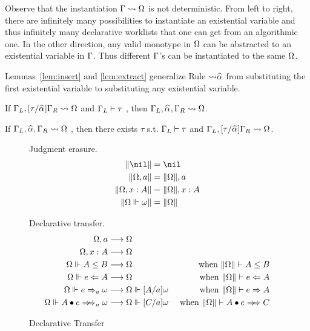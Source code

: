 Observe that the instantiation $\Gamma\rightsquigarrow\Omega$ is not deterministic.
From left to right, there are infinitely many possibilities to instantiate an existential variable and
thus infinitely many declarative worklists that one can get from an algorithmic one.
In the other direction, any valid monotype in $\Omega$ can be abstracted to an
existential variable in $\Gamma$. Thus different $\Gamma$'s can be instantiated to the same
$\Omega$.

Lemmas~\ref{lem:insert} and \ref{lem:extract}
generalize Rule $\mathtt{{\sto}\al}$ from substituting the first existential variable
to substituting any existential variable.

\begin{lemma}[Insert]\label{lem:insert}
If $\Gm_L, [\tau/\al]\Gm_R \sto \Om$ and $\Gamma_L\vdash \tau$
, then $\Gm_L, \al, \Gm_R \sto \Om$.
\end{lemma}
\begin{lemma}[Extract]\label{lem:extract}
If $\Gm_L, \al, \Gm_R \sto \Om$
, then there exists $\tau$ s.t. $\Gamma_L\vdash\tau$ and $\Gm_L, [\tau/\al]\Gm_R \sto \Om$.
\end{lemma}

\begin{figure}[t]
\hfill \framebox{$\|\Om\|$} \hfill Judgment erasure.
\begin{gather*}
\begin{aligned}
\|\nil\| &= \nil\\
\|\Om,a\| &= \|\Om\|, a\\
\|\Om,x:A\| &= \|\Om\|, x:A\\
\|\Om\Vdash\jg\| &= \|\Om\|
\end{aligned}
\end{gather*}

\hfill {} \hfill Declarative transfer.
\begin{gather*}
\begin{aligned}
\Om,a &\rto \Om \\  \Om,x:A & \rto \Om\\
\Om\Vdash A\le B &\rto \Om &\text{ when } \|\Om\| \vdash A\le B\\
\Om\Vdash e\Lto A &\rto \Om & \text{ when } \|\Om\| \vdash e\Lto A\\
\Om\Vdash e\To_a \jg &\rto \Om\Vdash[A/a]\jg & \text{ when } \|\Om\| \vdash e\To A\\
\Om\Vdash \appInfAlg{A}{e} &\rto \Om\Vdash[C/a]\jg & \text{ when } \|\Om\| \vdash \appInf{A}{e}{C}\\
\end{aligned}
\end{gather*}
\caption{Declarative Transfer}
\label{fig:decl:worklist}
\end{figure}

